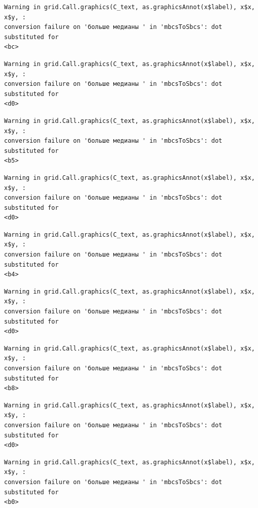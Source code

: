 \documentclass[
  letterpaper,
  DIV=11,
  numbers=noendperiod]{scrreprt}
\theoremstyle{definition}
\theoremstyle{remark}
\begin{document}
\begin{verbatim}
Warning in grid.Call.graphics(C_text, as.graphicsAnnot(x$label), x$x, x$y, :
conversion failure on 'больше медианы ' in 'mbcsToSbcs': dot substituted for
<bc>
\end{verbatim}

\begin{verbatim}
Warning in grid.Call.graphics(C_text, as.graphicsAnnot(x$label), x$x, x$y, :
conversion failure on 'больше медианы ' in 'mbcsToSbcs': dot substituted for
<d0>
\end{verbatim}

\begin{verbatim}
Warning in grid.Call.graphics(C_text, as.graphicsAnnot(x$label), x$x, x$y, :
conversion failure on 'больше медианы ' in 'mbcsToSbcs': dot substituted for
<b5>
\end{verbatim}

\begin{verbatim}
Warning in grid.Call.graphics(C_text, as.graphicsAnnot(x$label), x$x, x$y, :
conversion failure on 'больше медианы ' in 'mbcsToSbcs': dot substituted for
<d0>
\end{verbatim}

\begin{verbatim}
Warning in grid.Call.graphics(C_text, as.graphicsAnnot(x$label), x$x, x$y, :
conversion failure on 'больше медианы ' in 'mbcsToSbcs': dot substituted for
<b4>
\end{verbatim}

\begin{verbatim}
Warning in grid.Call.graphics(C_text, as.graphicsAnnot(x$label), x$x, x$y, :
conversion failure on 'больше медианы ' in 'mbcsToSbcs': dot substituted for
<d0>
\end{verbatim}

\begin{verbatim}
Warning in grid.Call.graphics(C_text, as.graphicsAnnot(x$label), x$x, x$y, :
conversion failure on 'больше медианы ' in 'mbcsToSbcs': dot substituted for
<b8>
\end{verbatim}

\begin{verbatim}
Warning in grid.Call.graphics(C_text, as.graphicsAnnot(x$label), x$x, x$y, :
conversion failure on 'больше медианы ' in 'mbcsToSbcs': dot substituted for
<d0>
\end{verbatim}

\begin{verbatim}
Warning in grid.Call.graphics(C_text, as.graphicsAnnot(x$label), x$x, x$y, :
conversion failure on 'больше медианы ' in 'mbcsToSbcs': dot substituted for
<b0>
\end{verbatim}
\end{document}
